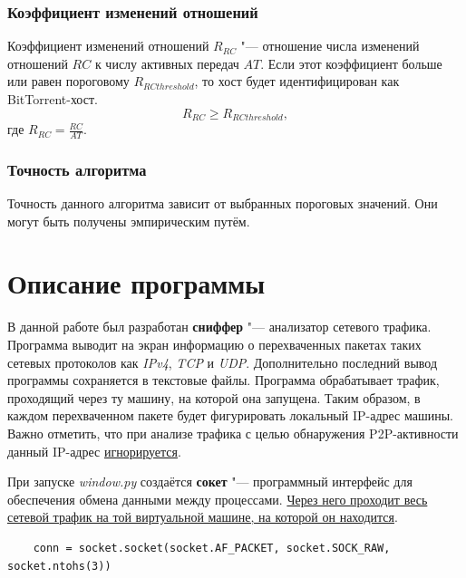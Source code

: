 \documentclass[bachelor, och, coursework]{SCWorks}
\begin{document}
\subsubsection{Коэффициент изменений отношений}
Коэффициент изменений отношений $R_{RC}$ "--- отношение числа изменений отношений $RC$ к числу активных передач $AT$.
Если этот коэффициент больше или равен пороговому $R_{RCthreshold}$, то хост будет идентифицирован как BitTorrent-хост.
\[ R_{RC} \geq R_{RCthreshold}, \]
где $R_{RC} = \frac{RC}{AT}$.

\subsubsection{Точность алгоритма}
Точность данного алгоритма зависит от выбранных пороговых значений. Они могут быть получены эмпирическим путём.

\section{Описание программы}
В данной работе был разработан \textbf{сниффер} "--- анализатор сетевого трафика. 
Программа выводит на экран информацию о перехваченных пакетах таких сетевых протоколов как \textit{IPv4}, \textit{TCP} и \textit{UDP}. 
Дополнительно последний вывод программы сохраняется в текстовые файлы. Программа обрабатывает трафик, проходящий через ту машину, на которой
она запущена. Таким образом, в каждом перехваченном пакете будет фигурировать локальный IP-адрес машины. Важно отметить, что при анализе трафика
с целью обнаружения P2P-активности данный IP-адрес \underline{игнорируется}.

При запуске \textit{window.py} создаётся \textbf{сокет} "--- программный интерфейс для обеспечения обмена данными между процессами. 
\underline{Через него проходит весь} \\ \underline{сетевой трафик на той виртуальной машине, на которой он находится}. 

\begin{verbatim}
    conn = socket.socket(socket.AF_PACKET, socket.SOCK_RAW, socket.ntohs(3))
\end{verbatim}
\end{document}
